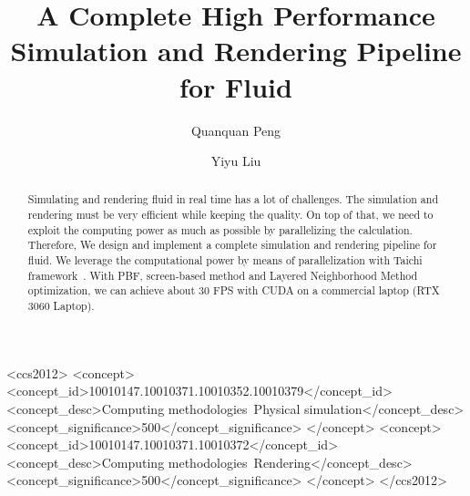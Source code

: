 \documentclass[sigconf]{acmart}
\begin{document}
\title{A Complete High Performance Simulation and Rendering Pipeline for Fluid}

\author{Quanquan Peng}
\author{Yiyu Liu}
\authornotemark[1]

\renewcommand{\shortauthors}{Trovato et al.}

\begin{abstract}
  Simulating and rendering fluid in real time has a lot of challenges. The simulation and rendering must be very efficient while keeping the quality. On top of that, we need to exploit the computing power as much as possible by parallelizing the calculation.
  Therefore, We design and implement a complete simulation and rendering pipeline for fluid. We leverage the computational power by means of parallelization with Taichi framework~\cite{hu2019taichi, hu2019difftaichi, hu2021quantaichi}. With PBF, screen-based method and Layered Neighborhood Method optimization, we can achieve about 30 FPS with CUDA on a commercial laptop (RTX 3060 Laptop).
\end{abstract}

\begin{CCSXML}
<ccs2012>
<concept>
<concept_id>10010147.10010371.10010352.10010379</concept_id>
<concept_desc>Computing methodologies~Physical simulation</concept_desc>
<concept_significance>500</concept_significance>
</concept>
<concept>
<concept_id>10010147.10010371.10010372</concept_id>
<concept_desc>Computing methodologies~Rendering</concept_desc>
<concept_significance>500</concept_significance>
</concept>
</ccs2012>
\end{CCSXML}
\end{document}
